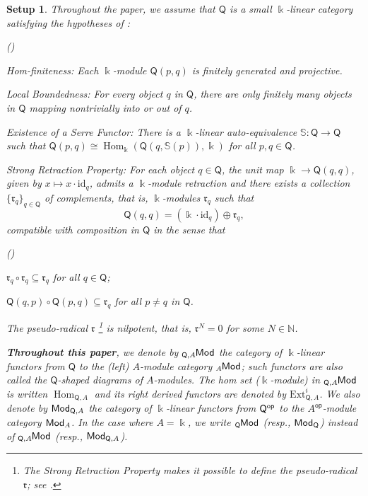 \documentclass{amsart}
\theoremstyle{bfupright head,slanted body}
\theoremstyle{bfupright head,upright body}
\theoremstyle{fixed bf head,slanted body}
\theoremstyle{fixed bf head,upright body}
\newtheorem{setup}[res]{Setup}           \newtheorem*{setup*}{Setup}
\theoremstyle{numbered paragraph}
\newlength{\thmlistleft}        %
\newlength{\thmlistright}       %
\newlength{\thmlistpartopsep}   %
\newlength{\thmlisttopsep}      %
\newlength{\thmlistparsep}      %
\newlength{\thmlistitemsep}     %
\newcounter{eqc}
\newenvironment{eqc}{\begin{list}{\upshape (\textit{\roman{eqc}})}%
		{\usecounter{eqc}%
			\setlength{\leftmargin}{\thmlistleft}%
			\setlength{\labelwidth}{\thmlistleft}%
			\setlength{\rightmargin}{\thmlistright}%
			\setlength{\partopsep}{\thmlistpartopsep}%
			\setlength{\topsep}{\thmlisttopsep}%
			\setlength{\parsep}{\thmlistparsep}%
			\setlength{\itemsep}{\thmlistitemsep}}}%
	{\end{list}}%
\newcounter{rqm}
\newenvironment{rqm}{\begin{list}{\upshape (\arabic{rqm})}%
		{\usecounter{rqm}%
			\setlength{\leftmargin}{\thmlistleft}%
			\setlength{\labelwidth}{\thmlistleft}%
			\setlength{\rightmargin}{\thmlistright}%
			\setlength{\partopsep}{\thmlistpartopsep}%
			\setlength{\topsep}{\thmlisttopsep}%
			\setlength{\parsep}{\thmlistparsep}%
			\setlength{\itemsep}{\thmlistitemsep}}}%
	{\end{list}}%
\numberwithin{equation}{res}
\newcommand{\Hom}{\operatorname{Hom}}
\newcommand{\Q}{\mathsf{Q}}
\newcommand{\id}{\mathrm{id}}
\newcommand{\kk}{\Bbbk}
\newcommand{\is}{\cong}
\newcommand{\lMod}[1]{{}_{#1}\mspace{-1mu}{\sf{Mod}}}
\newcommand{\rMod}[1]{{\sf{Mod}}_{#1}}
\newcommand{\Aop}{A^{\mathsf{op}}}
\begin{document}
\begin{setup}\label{setup:Q}
Throughout the paper, we assume that $\Q$ is a small $\kk$-linear
category satisfying the hypotheses of \cite[Setup 2.9]{HJ24}:
\begin{rqm}
\item \emph{Hom-finiteness}: Each $\kk$-module $\Q(p,q)$ is finitely generated and projective.
\item \emph{Local Boundedness}: For every object $q$ in $\Q$, there are only finitely many objects in $\Q$ mapping nontrivially into or out of $q$.
\item \emph{Existence of a Serre Functor}: There is a $\kk$-linear auto-equivalence $\mathbb{S}: \Q \to \Q$ such that $\Q(p,q)\is\Hom_{\kk}(\Q(q,\mathbb{S}(p)),\kk)$ for all $p,q\in\Q$.
\item \emph{Strong Retraction Property}: For each object $q\in\Q$, the unit map $\kk\to \Q(q,q)$, given by $x\mapsto x\cdot\id_q$, admits a $\kk$-module retraction and there exists a collection $\{\mathfrak{r}_q\}_{q\in\Q}$ of complements, that is, $\kk$-modules $\mathfrak{r}_q$ such that
      $$\Q(q,q)=(\kk\cdot\id_q)\oplus\mathfrak{r}_q,$$
      compatible with composition in $\Q$ in the sense that
    \begin{eqc}
    \item[($\dagger$)] $\mathfrak{r}_q\circ\mathfrak{r}_q\subseteq\mathfrak{r}_q$ for all $q\in\Q$;
    \item[($\ddagger$)] $\Q(q,p)\circ\Q(p,q)\subseteq\mathfrak{r}_q$ for all $p\neq q$ in $\Q$.
    \end{eqc}
\item The pseudo-radical $\mathfrak{r}$ \footnote{The Strong Retraction Property makes it possible to define the pseudo-radical $\mathfrak{r}$; see \cite[Remark 7.4 and Lemma 7.7]{HJ22}.} is nilpotent, that is, $\mathfrak{r}^N=0$ for some $N\in\mathbb{N}$.
\end{rqm}

{\bf Throughout this paper}, we denote by $\lMod{\Q,A}$ the category of $\kk$-linear functors from $\Q$ to the (left) $A$-module category $\lMod{A}$; such functors are also called the $\Q$-shaped diagrams of $A$-modules. The hom set ($\kk$-module) in $\lMod{\Q,A}$ is written $\Hom_{\Q,A}$ and its right derived functors are denoted by $\mathrm{Ext}_{\Q,A}^i$. We also denote by $\rMod{\Q,A}$ the category of $\kk$-linear functors from $\Q^{\sf op}$ to the $\Aop$-module category $\rMod{A}$. In the case where $A=\kk$, we write $\lMod{\Q}$ (resp., $\rMod{\Q}$) instead of $\lMod{\Q,A}$ (resp., $\rMod{\Q,A}$).
\end{setup}
\end{document}

